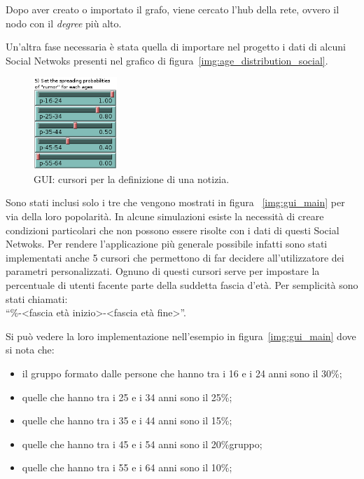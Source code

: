 Dopo aver creato o importato il grafo, viene cercato l'hub della rete, ovvero il nodo con il \emph{degree} più alto.

Un'altra fase necessaria è stata quella di importare nel progetto i dati di alcuni Social Netwoks
presenti nel grafico di figura~\ref{img:age_distribution_social}.

\begin{figure}
  \vspace*{-20pt}
  \begin{center}
    \includegraphics[width=0.28\textwidth]{img/gui-news.png}
  \end{center}
 \vspace*{-10pt}
 \caption{GUI: 
 cursori per la definizione di una notizia.}
 \vspace*{-10pt}
 \label{img:gui_news}
\end{figure}
Sono stati inclusi solo i tre che vengono  mostrati in figura ~\ref{img:gui_main} per via della loro popolarità.
In alcune simulazioni esiste la necessità di creare condizioni particolari che non possono essere risolte con i dati 
di questi Social Netwoks.
Per rendere l'applicazione più generale possibile infatti sono stati implementati anche 5 cursori che permettono di far 
decidere all'utilizzatore dei parametri personalizzati.
Ognuno di questi cursori serve per impostare la percentuale di utenti facente parte della suddetta fascia d'età.
Per semplicità sono stati chiamati:\\``\%-<fascia età inizio>-<fascia età fine>''.

Si può vedere la loro implementazione nell'esempio in figura~\ref{img:gui_main} dove si nota che:
\begin{itemize}
 \item il gruppo formato dalle persone che hanno tra i 16 e i 24 anni sono il 30\%;
 \item quelle che hanno tra i 25 e i 34 anni sono il 25\%;
 \item quelle che hanno tra i 35 e i 44 anni sono il 15\%;
 \item quelle che hanno tra i 45 e i 54 anni sono il 20\%gruppo;
 \item quelle che hanno tra i 55 e i 64 anni sono il 10\%;
\end{itemize}



